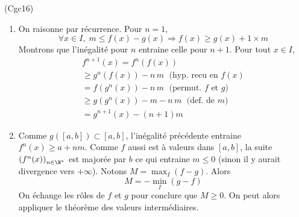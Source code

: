 \begin{tiny}(Cgc16)\end{tiny} 
\begin{enumerate}
  \item On raisonne par  récurrence. Pour $n=1$,
\begin{displaymath}
\forall x \in I,\; m \leq f(x) - g(x) \Rightarrow f(x) \geq g(x) + 1\times m  
\end{displaymath}
Montrons que l'inégalité pour $n$ entraine celle pour $n+1$. Pour tout $x\in I$, 
\begin{multline*}
f^{n+1}(x) = f^{n}(f(x))\\
\geq g^{n}(f(x)) -n\,m  \;\text{ (hyp. recu en $f(x)$} \\
= f(g^{n}(x)) - n\,m \;\text{ (permut. $f$ et $g$)} \\
\geq g(g^{n}(x)) -m - n\,m \;\text{ (def. de $m$)} \\
= g^{n+1}(x) -(n+1)m
\end{multline*}

  \item Comme $g([a,b])\subset [a,b]$, l'inégalité précédente entraine $f^n(x) \geq a + nm$. Comme $f$ aussi est à valeurs dans $[a,b]$, la suite $\left( f^n(x)\right)_{n\in \N^*}$ est majorée par $b$ ce qui entraine $m\leq 0$ (sinon il y aurait divergence vers $+\infty$).\newline
  Notons $M = \max_{I}(f-g)$. Alors 
\begin{displaymath}
  M = -\min_{I}(g-f)
\end{displaymath}
On échange les rôles de $f$ et $g$ pour conclure que $M\geq 0$. On peut alors appliquer le théorème des valeurs intermédiaires. 
\end{enumerate}
